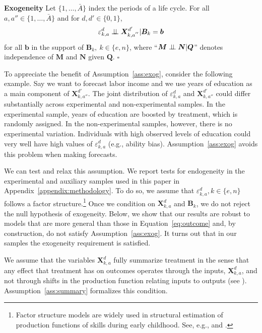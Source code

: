 \onehalfspacing
\begin{assumption}\label{ass:exog} \textbf{Exogeneity}
Let $\{ 1, \ldots, \bar{A} \}$ index the periods of a life cycle. For all $a, a'' \in \{ 1, \ldots, \bar{A} \}$ and for $d, d' \in \{0,1\}$,
\begin{equation}
\varepsilon^d_{k,a} \perp\!\!\!\perp \bm{X}^{d^{\prime}}_{k,a^{''}} | \bm{B}_k = \bm{b}
\end{equation}
for all $\bm{b}$ in the support of $\bm{B}_k, \: k \in \{e,n\}$, where ``$\bm{M} \perp\!\!\!\perp \bm{N}|\bm{Q}$'' denotes independence of $\bm{M}$ and $\bm{N}$ given $\bm{Q}$. $\square$
\end{assumption}
\doublespacing

To appreciate the benefit of Assumption~\ref{ass:exog}, consider the following example. Say we want to forecast labor income and we use years of education as a main component of $\bm{X}_{k,{a''}}^{d'}$. The joint distribution of $\varepsilon_{k,a}^d$ and $\bm{X}_{k,{a''}}^{d'}$ could differ substantially across experimental and non-experimental samples. In the experimental sample, years of education are boosted by treatment, which is randomly assigned. In the non-experimental samples, however, there is no experimental variation. Individuals with high observed levels of education could very well have high values of  $\varepsilon_{k,a}^d$ (e.g., ability bias). Assumption~\ref{ass:exog} avoids this problem when making forecasts.

We can test and relax this assumption. We report tests for endogeneity in the experimental and auxiliary samples used in this paper in Appendix~\ref{appendix:methodology}. To do so, we assume that $\varepsilon_{k,a}^d, k \in \{e,n\}$ follows a factor structure.\footnote{Factor structure models are widely used in structural estimation of production functions of skills during early childhood. See, e.g., \citet{Cunha_Heckman_2008_JHR} and \citet{Cunha_Heckman_etal_2010_est_tech_cognoncog}.} Once we condition on $\bm{X}_{k,a}^d$ and $\bm{B}_{k}$, we do not reject the null hypothesis of exogeneity. Below, we show that our results are robust to models that are more general than those in Equation~\eqref{eq:outcome} and, by construction, do not satisfy Assumption~\ref{ass:exog}. It turns out that in our samples the exogeneity requirement is satisfied.

We assume that the variables $\bm{X}_{k,a}^d$ fully summarize treatment in the sense that any effect that treatment has on outcomes operates through the inputs, $\bm{X}_{k,a}^d$, and not through shifts in the production function relating inputs to outputs (see \citealp{Heckman_Pinto_etal_2013_PerryFactor}). Assumption~\ref{ass:summary} formalizes this condition.

